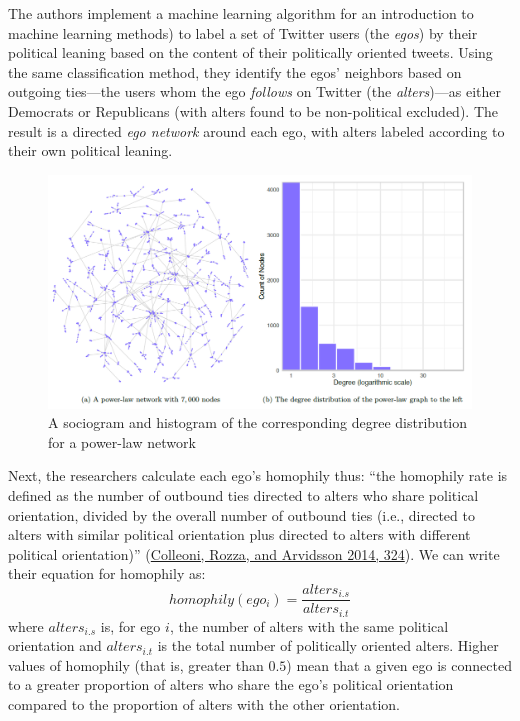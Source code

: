 \documentclass{book}
\begin{document}
The authors implement a machine learning algorithm for an introduction to
machine learning methods) to label a set of Twitter users (the \emph{egos}) by
their political leaning based on the content of their politically oriented
tweets. Using the same classification method, they identify the egos'
neighbors based on outgoing ties---the users whom the ego \emph{follows} on
Twitter (the \emph{alters})---as either Democrats or Republicans (with alters
found to be non-political excluded). The result is a directed \emph{ego
network} around each ego, with alters labeled according to their own political
leaning.

\begin{figure}
\hypertarget{fig:fig11-14}{%
\centering
\includegraphics{images/social-networks/11-14.png}
\caption{A sociogram and histogram of the corresponding degree distribution
for a power-law network}\label{fig:fig11-14}
}
\end{figure}

Next, the researchers calculate each ego's homophily thus: ``the homophily
rate is defined as the number of outbound ties directed to alters who share
political orientation, divided by the overall number of outbound ties (i.e.,
directed to alters with similar political orientation plus directed to alters
with different political orientation)''
(\protect\hyperlink{ref-ColleoniEtAl2014}{Colleoni, Rozza, and Arvidsson 2014,
324}). We can write their equation for homophily as:
\[homophily(ego_i) = \frac{alters_{i.s}}{alters_{i.t}}\] where
\(alters_{i.s}\) is, for ego \(i\), the number of alters with the same
political orientation and \(alters_{i.t}\) is the total number of politically
oriented alters. Higher values of homophily (that is, greater than \(0.5\))
mean that a given ego is connected to a greater proportion of alters who share
the ego's political orientation compared to the proportion of alters with the
other orientation.
\end{document}
